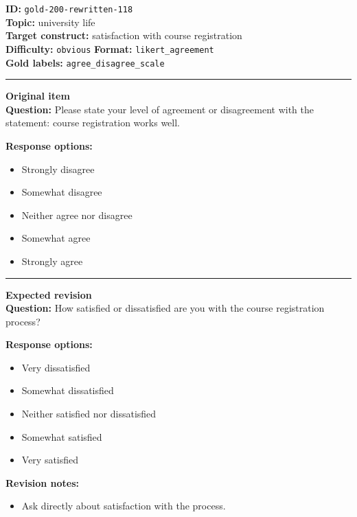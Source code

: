 \documentclass[10pt,a4paper]{article}
\newcommand{\sectionline}{\vspace{0.15em}\hrule\vspace{0.35em}}
\begin{document}
\begin{tcolorbox}[colframe=FlawRed,colback=white,colbacktitle=FlawRed!9,coltitle=black,title={Item 118\hfill Flawed item}]
\textbf{ID:} \texttt{gold-200-rewritten-118}\\
\textbf{Topic:} university life\\
\textbf{Target construct:} satisfaction with course registration\\
\textbf{Difficulty:} \texttt{obvious} \quad \textbf{Format:} \texttt{likert\_agreement}\\
\textbf{Gold labels:} \texttt{agree\_disagree\_scale}\\
\sectionline
\textbf{Original item}\\
\textbf{Question:} Please state your level of agreement or disagreement with the statement: course registration works well.
\par\textbf{Response options:}
\begin{itemize}
\item Strongly disagree
\item Somewhat disagree
\item Neither agree nor disagree
\item Somewhat agree
\item Strongly agree
\end{itemize}
\sectionline
\textbf{Expected revision}\\
\textbf{Question:} How satisfied or dissatisfied are you with the course registration process?
\par\textbf{Response options:}
\begin{itemize}
\item Very dissatisfied
\item Somewhat dissatisfied
\item Neither satisfied nor dissatisfied
\item Somewhat satisfied
\item Very satisfied
\end{itemize}
\par\textbf{Revision notes:}
\begin{itemize}
\item Ask directly about satisfaction with the process.
\end{itemize}
\end{tcolorbox}
\end{document}
